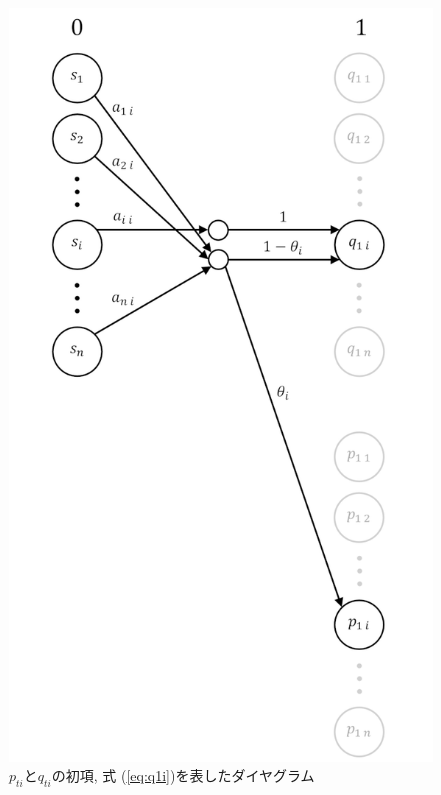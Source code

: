 \begin{figure}[H]
    \begin{center}
        \includegraphics[width=0.7\linewidth]{figs/pq_0.png}
        \caption{$p_{t i}$と$q_{t i}$の初項, 式 (\ref{eq:q1i})を表したダイヤグラム}
        \label{fig:pq1}
    \end{center}
\end{figure}

